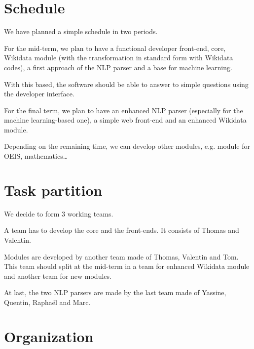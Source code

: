 \documentclass[a4paper,10pt]{article}
\begin{document}
\section{Schedule}

We have planned a simple schedule in two periods.

For the mid-term, we plan to have a functional developer front-end, core, Wikidata module (with the transformation in standard form with Wikidata codes), a first approach of the NLP parser and a base for machine learning.

With this based, the software should be able to answer to simple questions using the developer interface.

For the final term, we plan to have an enhanced NLP parser (especially for the machine learning-based one), a simple web front-end and an enhanced Wikidata module.

Depending on the remaining time, we can develop other modules, e.g. module for OEIS, mathematics\ldots

\section{Task partition}

We decide to form 3 working teams.

A team has to develop the core and the front-ends. It consists of Thomas and Valentin.

Modules are developed by another team made of Thomas, Valentin and Tom. This team should split at the mid-term in a team for enhanced Wikidata module and another team for new modules.

At last, the two NLP parsers are made by the last team made of Yassine, Quentin, Raphaël and Marc.


\section{Organization}

\end{document}

